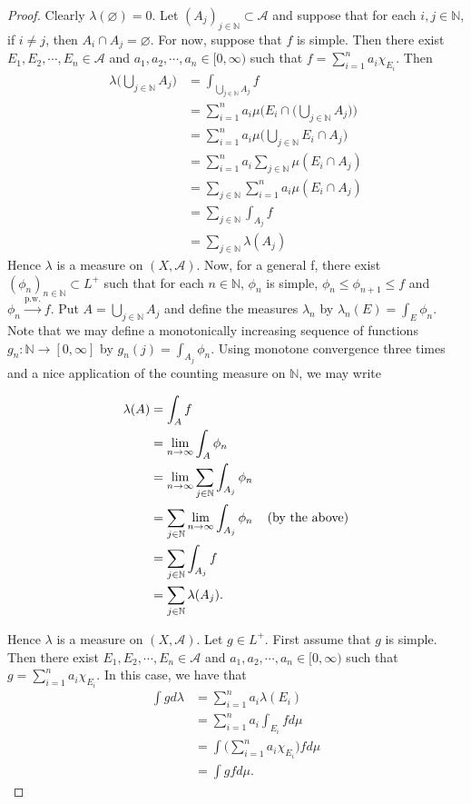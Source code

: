 \documentclass[12pt]{amsart}
\newcommand{\lam}{\lambda}
\newcommand{\N}{\mathbb{N}}
\newcommand{\MA}{\mathcal{A}}
\newcommand{\RG}{[0,\infty]}
\newcommand{\Rg}{[0,\infty)}
\newcommand{\limn}{\lim \limits_{n \rightarrow \infty}}
\begin{document}
\begin{proof}
Clearly $\lam(\varnothing) = 0$. Let $(A_j)_{j \in \N} \subset \MA$ and suppose that for each $i, j \in \N$, if $i \neq j$, then $A_i \cap A_j = \varnothing$. For now, suppose that $f$ is simple. Then there exist $E_1, E_2, \cdots, E_n \in \MA$ and  $a_1, a_2, \cdots, a_n \in \Rg$ such that $f = \sum\limits_{i=1}^n a_i \chi_{E_i}$.  Then 
\begin{align*}
\lam\bigg(\bigcup_{j \in \N} A_j\bigg) 
&= \int_{\bigcup_{j \in \N} A_j} f\\
&= \sum_{i = 1} ^n a_i\mu\bigg(E_i \cap \bigg(\bigcup_{j \in \N} A_j\bigg)\bigg)\\
&= \sum_{i = 1} ^n a_i\mu\bigg(\bigcup_{j \in \N} E_i \cap A_j\bigg)\\
&= \sum_{i = 1} ^n a_i \sum_{j \in \N} \mu(E_i \cap A_j)\\
&= \sum_{j \in \N} \sum_{i = 1} ^n a_i \mu(E_i \cap A_j)\\
&= \sum_{j \in \N} \int_{A_j} f\\
&= \sum_{j \in \N} \lam(A_j)
\end{align*} 
Hence $\lam$ is a measure on $(X, \MA)$. Now, for a general f, there exist $(\phi_n)_{n \in \N} \subset L^+$ such that for each $n \in \N$, $\phi_n$ is simple, $\phi_n \leq \phi_{n+1} \leq f$ and $\phi_n \xrightarrow{\text{p.w.}} f$. Put $A = \bigcup_{j \in \N}A_j$ and define the measures $\lam_n$ by $\lam_n(E) = \int_E \phi_n$. Note that we may define a monotonically increasing sequence of functions $g_n: \N \rightarrow \RG$ by $g_n(j) = \int_{A_j} \phi_n$. Using monotone convergence three times and a nice application of the counting measure on $\N$, we may write

\begin{align*}
\lam(A) 
&= \int_A f\\
&= \limn \int_A \phi_n\\
&= \limn \sum_{j \in \N} \int_{A_j} \phi_n\\
&= \sum_{j \in \N} \limn \int_{A_j} \phi_n \hspace{4mm} \text{(by the above)}\\
&= \sum_{j \in \N} \int_{A_j} f\\
&= \sum_{j \in \N} \lam(A_j).
\end{align*} 

Hence $\lam$ is a measure on $(X, \MA)$. Let $g \in L^+$. First assume that $g$ is simple. Then there exist $E_1, E_2, \cdots, E_n \in \MA$ and  $a_1, a_2, \cdots, a_n \in \Rg$ such that $g = \sum\limits_{i=1}^n a_i \chi_{E_i}$.
In this case, we have that 
\begin{align*}
\int g d\lam 
&= \sum_{i=1}^n a_i \lam(E_i)\\
&= \sum_{i=1}^n a_i \int_{E_i} f d\mu\\
&= \int \bigg(\sum_{i=1}^n a_i\chi_{E_i} \bigg) f d\mu\\
&= \int gf d\mu.
\end{align*}


\end{proof}
\end{document}
